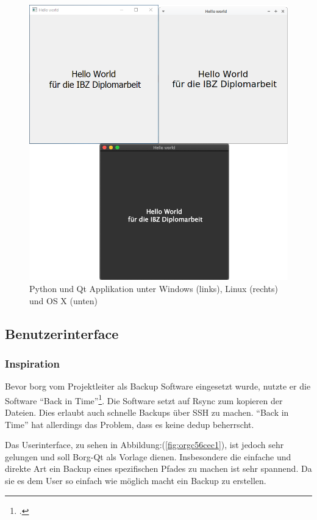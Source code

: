 \begin{figure}[htbp]
\centering
\includegraphics[width=.9\linewidth]{pictures/hello_world.png}
\caption{\label{fig:orgf39d17a}
Python und Qt Applikation unter Windows (links), Linux (rechts) und OS X (unten)}
\end{figure}

\subsection{Benutzerinterface}
\label{sec:orgebaec30}
\subsubsection{Inspiration}
\label{sec:orgda858d3}

Bevor \gls{borg} vom Projektleiter als Backup Software eingesetzt wurde, nutzte
er die Software "`Back in Time"'\footcite{backintime}. Die Software setzt auf Rsync
zum kopieren der Dateien. Dies erlaubt auch schnelle Backups über SSH zu
machen. "`Back in Time"' hat allerdings das Problem, dass es keine \gls{dedup}
beherrscht.

Das Userinterface, zu sehen in Abbildung:(\ref{fig:orgc56cec1}), ist jedoch sehr
gelungen und soll Borg-Qt als Vorlage dienen. Insbesondere die einfache und
direkte Art ein Backup eines spezifischen Pfades zu machen ist sehr spannend.
Da sie es dem User so einfach wie möglich macht ein Backup zu erstellen.

